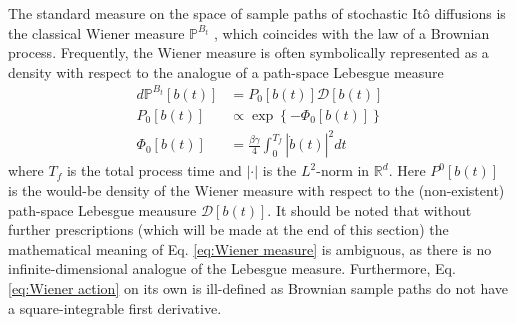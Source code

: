The standard measure on the space of sample paths of stochastic It\^{o} diffusions is the classical Wiener measure $\mathbb{P}^{B_t}$ \citep{cameronTransformationsWeinerIntegrals1944, cameronTransformationsWienerIntegrals1945, grossAbstractWienerSpaces}, which coincides with the law of a Brownian process. Frequently, the Wiener measure is often symbolically represented as a density with respect to the analogue of a path-space Lebesgue measure
\begin{subequations}
\begin{align} \label{eq:Wiener measure} 
d \mathbb{P}^{B_t}[b(t)] & = P_0[b(t)] \mathcal{D}[b(t)] \\
P_0[b(t)] & \propto \exp \left\{ - \Phi_0[b(t)] \right\} \label{eq:Wiener density} \\
\Phi_0[b(t)] & = \frac{\beta \gamma}{4} \int^{T_f}_0 | \dot{b}(t)|^2 dt \label{eq:Wiener action}
\end{align}
\end{subequations}
where $T_f$ is the total process time and $|\cdot|$ is the $L^2$-norm in $\mathbb{R}^d$. Here $P^{0}[b(t)]$ is the would-be density of the Wiener measure with respect to the (non-existent) path-space Lebesgue meausure $\mathcal{D}[b(t)]$. It should be noted that without further prescriptions (which will be made at the end of this section) the mathematical meaning of Eq. \ref{eq:Wiener measure} is ambiguous, as there is no infinite-dimensional analogue of the Lebesgue measure. Furthermore, Eq. \ref{eq:Wiener action} on its own is ill-defined as Brownian sample paths do not have a square-integrable first derivative.

